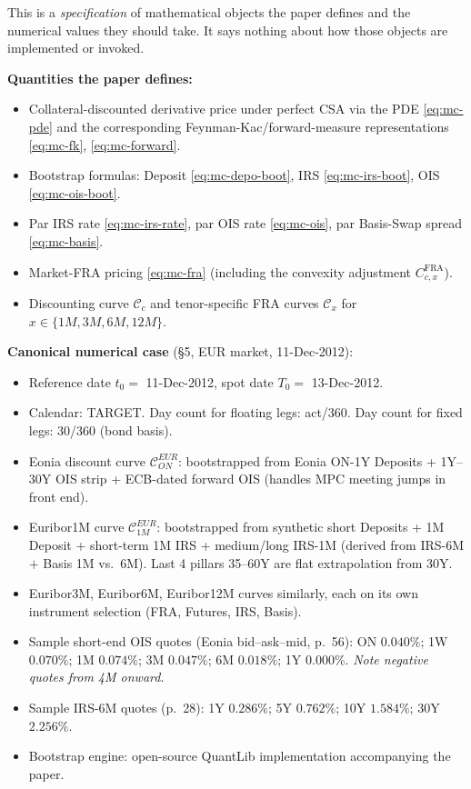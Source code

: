 \documentclass[11pt,a4paper]{article}
\begin{document}
\begin{validation}
This is a \emph{specification} of mathematical objects the paper
defines and the numerical values they should take. It says nothing
about how those objects are implemented or invoked.

\textbf{Quantities the paper defines:}
\begin{itemize}[noitemsep]
  \item Collateral-discounted derivative price under perfect CSA via
        the PDE \eqref{eq:mc-pde} and the corresponding
        Feynman-Kac/forward-measure representations \eqref{eq:mc-fk},
        \eqref{eq:mc-forward}.
  \item Bootstrap formulas: Deposit \eqref{eq:mc-depo-boot}, IRS
        \eqref{eq:mc-irs-boot}, OIS \eqref{eq:mc-ois-boot}.
  \item Par IRS rate \eqref{eq:mc-irs-rate}, par OIS rate
        \eqref{eq:mc-ois}, par Basis-Swap spread \eqref{eq:mc-basis}.
  \item Market-FRA pricing \eqref{eq:mc-fra} (including the
        convexity adjustment $C^{\text{FRA}}_{c,x}$).
  \item Discounting curve $\mathcal{C}_c$ and tenor-specific FRA
        curves $\mathcal{C}_x$ for $x \in \{1M, 3M, 6M, 12M\}$.
\end{itemize}

\textbf{Canonical numerical case} (\S5, EUR market, 11-Dec-2012):
\begin{itemize}[noitemsep]
  \item Reference date $t_0 = $ 11-Dec-2012, spot date $T_0 = $ 13-Dec-2012.
  \item Calendar: TARGET. Day count for floating legs: act/360. Day count for fixed legs: 30/360 (bond basis).
  \item Eonia discount curve $\mathcal{C}^{EUR}_{ON}$: bootstrapped
        from Eonia ON-1Y Deposits + 1Y--30Y OIS strip + ECB-dated
        forward OIS (handles MPC meeting jumps in front end).
  \item Euribor1M curve $\mathcal{C}^{EUR}_{1M}$: bootstrapped from
        synthetic short Deposits + 1M Deposit + short-term 1M IRS
        + medium/long IRS-1M (derived from IRS-6M $+$ Basis 1M vs.\ 6M).
        Last 4 pillars 35--60Y are flat extrapolation from 30Y.
  \item Euribor3M, Euribor6M, Euribor12M curves similarly, each on
        its own instrument selection (FRA, Futures, IRS, Basis).
  \item Sample short-end OIS quotes (Eonia bid--ask--mid, p.~56):
        ON $0.040\%$; 1W $0.070\%$; 1M $0.074\%$; 3M $0.047\%$;
        6M $0.018\%$; 1Y $0.000\%$. \emph{Note negative quotes from 4M onward}.
  \item Sample IRS-6M quotes (p.~28): 1Y $0.286\%$; 5Y $0.762\%$;
        10Y $1.584\%$; 30Y $2.256\%$.
  \item Bootstrap engine: open-source QuantLib implementation accompanying the paper.
\end{itemize}


\end{validation}
\end{document}
